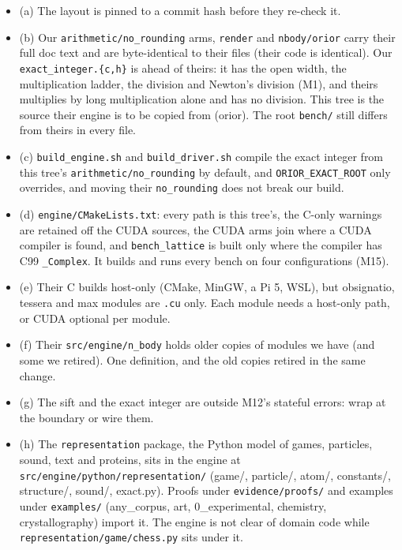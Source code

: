 \begin{enumerate}
\begin{itemize}
\item (a) The layout is pinned to a commit hash before they re-check it.
\item (b) Our \texttt{arithmetic/\allowbreak{}no\_\allowbreak{}rounding} arms, \texttt{render} and \texttt{nbody/\allowbreak{}orior} carry their full doc text and are byte-identical to their files (their code is identical). Our \texttt{exact\_\allowbreak{}integer.\allowbreak{}\{c,h\}} is ahead of theirs: it has the open width, the multiplication ladder, the division and Newton's division (M1), and theirs multiplies by long multiplication alone and has no division. This tree is the source their engine is to be copied from (orior). The root \texttt{bench/\allowbreak{}} still differs from theirs in every file.
\item (c) \texttt{build\_\allowbreak{}engine.\allowbreak{}sh} and \texttt{build\_\allowbreak{}driver.\allowbreak{}sh} compile the exact integer from this tree's \texttt{arithmetic/\allowbreak{}no\_\allowbreak{}rounding} by default, and \texttt{ORIOR\_\allowbreak{}EXACT\_\allowbreak{}ROOT} only overrides, and moving their \texttt{no\_\allowbreak{}rounding} does not break our build.
\item (d) \texttt{engine/\allowbreak{}CMake\allowbreak{}Lists.\allowbreak{}txt}: every path is this tree's, the C-only warnings are retained off the CUDA sources, the CUDA arms join where a CUDA compiler is found, and \texttt{bench\_\allowbreak{}lattice} is built only where the compiler has C99 \texttt{\_\allowbreak{}Complex}. It builds and runs every bench on four configurations (M15).
\item (e) Their C builds host-only (CMake, MinGW, a Pi 5, WSL), but obsignatio, tessera and max modules are \texttt{.\allowbreak{}cu} only. Each module needs a host-only path, or CUDA optional per module.
\item (f) Their \texttt{src/\allowbreak{}engine/\allowbreak{}n\_\allowbreak{}body} holds older copies of modules we have (and some we retired). One definition, and the old copies retired in the same change.
\item (g) The sift and the exact integer are outside M12's stateful errors: wrap at the boundary or wire them.
\item (h) The \texttt{representation} package, the Python model of games, particles, sound, text and proteins, sits in the engine at \texttt{src/\allowbreak{}engine/\allowbreak{}python/\allowbreak{}representation/\allowbreak{}} (game/, particle/, atom/, constants/, structure/, sound/, exact.py). Proofs under \texttt{evidence/\allowbreak{}proofs/\allowbreak{}} and examples under \texttt{examples/\allowbreak{}} (any\_\allowbreak{}corpus, art, 0\_\allowbreak{}experimental, chemistry, crystallography) import it. The engine is not clear of domain code while \texttt{representation/\allowbreak{}game/\allowbreak{}chess.\allowbreak{}py} sits under it.

\end{itemize}
\end{enumerate}
